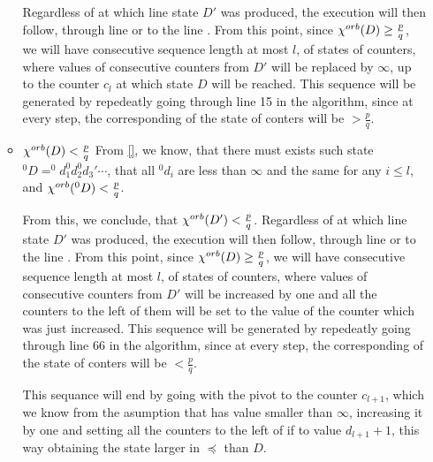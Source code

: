 \begin{itemize}
\begin{itemize}
Regardless of at which line state $D'$ was produced, the execution will then follow, 
through line  or to the line    . From this point, since ${\chi^{orb}(D)} \geq \frac{p}{q}$, we will 
have consecutive sequence length at most $l$, of states of counters, where 
values of consecutive counters 
from $D'$ will be 
replaced by $\infty$, up to the counter $c_l$ at which state $D$ will be reached. 
This sequence will be generated by repedeatly going through line 15 in the algorithm, since 
at every step, the corresponding \Eoc of the state of conters will be $> \frac{p}{q}$.

\item ${\chi^{orb}(D)} < \frac{p}{q}$
From \ref{}, we know, that there must exists such state $^0D = ^0d_1^0d_2^0d_3'\cdots$, that 
all $^0d_i$ are less than $\infty$ and the same for 
any $i \leq l$, and ${\chi^{orb}(^0D)} < \frac{p}{q}$. 

From this, we conclude, that ${\chi^{orb}(D')} < \frac{p}{q}$. 
Regardless of at which line state $D'$ was produced, the execution will then follow, 
through line  or to the line    . From this point, since ${\chi^{orb}(D)} \geq \frac{p}{q}$, we will 
have consecutive sequence length at most $l$, of states of counters, where 
values of consecutive counters 
from $D'$ will be increased by one and all the counters to the left of them will be set to 
the value of the counter which was just increased. 
This sequence will be generated by repedeatly going through line 66 in the algorithm, since 
at every step, the corresponding \Eoc of the state of conters will be $< \frac{p}{q}$.

This sequance will end by going with the pivot to the counter $c_{l+1}$, which we 
know from the asumption that has value smaller than $\infty$, increasing it by one 
and setting all the counters to the left of if to value $d_{l+1}+1$, this way obtaining 
the state larger in $\preceq$ than $D$. 
\end{itemize}


\end{itemize}
